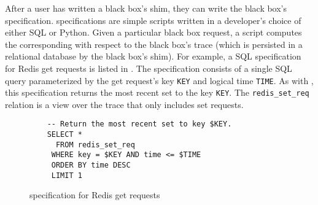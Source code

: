 After a user has written a black box's shim, they can write the black box's
\watprovenance{} specification. \fluent{} \watprovenance{} specifications are
simple scripts written in a developer's choice of either SQL or Python. Given a
particular black box request, a \watprovenance{}  script computes the
corresponding \watprovenance{} with respect to the black box's trace (which is
persisted in a relational database by the black box's shim). For example, a SQL
\watprovenance{} specification for Redis get requests is listed in
. The \watprovenance{} specification consists of
a single SQL query parameterized by the get request's key \texttt{KEY} and
logical time \texttt{TIME}. As with , this
\watprovenance{} specification returns the most recent set to the key
\texttt{KEY}. The \texttt{redis\_set\_req} relation is a view over the trace
that only includes set requests.

\begin{figure}[ht]
  \begin{Verbatim}
    -- Return the most recent set to key $KEY.
    SELECT *
      FROM redis_set_req
     WHERE key = $KEY AND time <= $TIME
     ORDER BY time DESC
     LIMIT 1
  \end{Verbatim}
  \caption{\Watprovenance{} specification for Redis get requests}
\end{figure}

